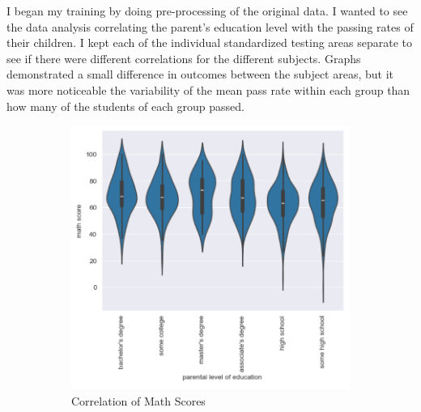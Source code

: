 \documentclass[fleqn,10pt]{olplainarticle}
\begin{document}
I began my training by doing pre-processing of the original data. I wanted to see the data analysis correlating the parent's education level with the passing rates of their children. I kept each of the individual standardized testing areas separate to see if there were different correlations for the different subjects. Graphs demonstrated a small difference in outcomes between the subject areas, but it was more noticeable the variability of the mean pass rate within each group than how many of the students of each group passed.
\linebreak[2]
\begin{figure}[h!]
    \centering
    \caption{Correlations of Parent Education to Student Subject Scores}
    \begin{subfigure}{0.3\textwidth}
    \includegraphics[width=\linewidth]{MathVsParent.png}
    \caption{Correlation of Math Scores}
    \label{fig:view}
    \end{subfigure}
    \begin{subfigure}{0.3\textwidth}

\end{subfigure}
\end{figure}
\end{document}
